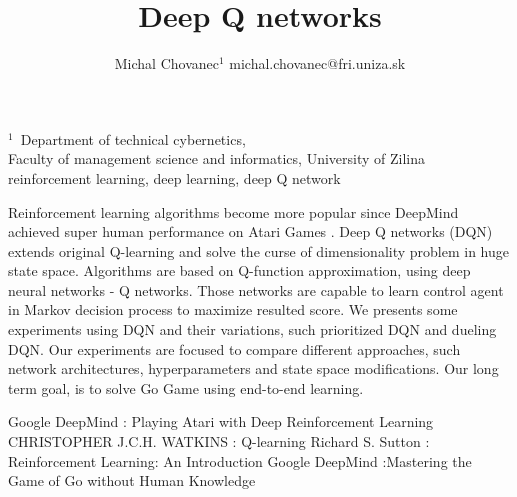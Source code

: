 \documentclass[10pt,a5paper]{article}
\begin{document}
\title{Deep Q networks}
\author{Michal Chovanec$^1$
michal.chovanec@fri.uniza.sk}
\date{}
\maketitle
\thispagestyle{empty}

\noindent$^1$\ Department of technical cybernetics, \\
Faculty of management science and informatics, University of Zilina\\

 reinforcement learning, deep learning, deep Q network

Reinforcement learning algorithms become more popular since
DeepMind achieved super human performance on Atari Games \cite{bib:atari}.
Deep Q networks (DQN) extends original Q-learning \cite{bib:q_learning} and solve
the curse of dimensionality problem in huge state space.
Algorithms are based on Q-function approximation, using deep neural networks - Q networks.
Those networks are capable to learn control agent in Markov decision process
 \cite{bib:rl_intro} to maximize resulted score.
 We presents some experiments using DQN and their variations, such
 prioritized DQN and dueling DQN. Our experiments are focused to compare
 different approaches, such network architectures, hyperparameters and
 state space modifications. Our long term goal, is to solve Go Game \cite{bib:alpha_go} using
 end-to-end learning.


%

\begin{thebibliography}{9}

     Google DeepMind : Playing Atari with Deep Reinforcement Learning
     CHRISTOPHER  J.C.H. WATKINS : Q-learning
     Richard S. Sutton : Reinforcement Learning: An Introduction
     Google DeepMind :Mastering the Game of Go without Human Knowledge

\end{thebibliography}
\end{document}
